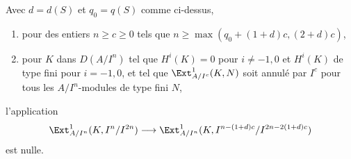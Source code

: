 \begin{lemma}
\label{lemma-bound-two-term-complex}
Avec $d = d(S)$ et $q_0 = q(S)$ comme ci-dessus,
\begin{enumerate}
\item pour des entiers $n \geq c \geq 0$ tels que $n \geq \max(q_0 + (1 + d)c, (2 + d)c)$,
\item pour $K$ dans $D(A/I^n)$ tel que $H^i(K) = 0$ pour $i \not = -1, 0$ et $H^i(K)$ de type fini pour $i = -1, 0$, et tel que $\Ext^1_{A/I^c}(K, N)$ soit annulé par $I^c$ pour tous les $A/I^n$-modules de type fini $N$,
\end{enumerate}
l'application
$$
\Ext^1_{A/I^n}(K, I^n/I^{2n})
\longrightarrow
\Ext^1_{A/I^n}(K, I^{n - (1 + d)c}/I^{2n - 2(1 + d)c})
$$
est nulle.
\end{lemma}

